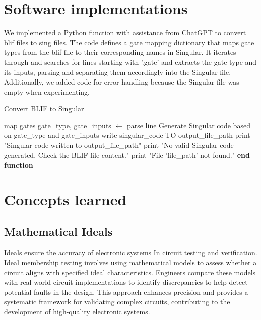 \documentclass[conference]{IEEEtran}
\begin{document}
\section{Software implementations} %
We implemented a Python function with assistance from ChatGPT to convert blif files to sing files. The code defines a gate mapping dictionary that maps gate types 
from the blif file to their corresponding names in Singular. It iterates through and searches for lines starting with '.gate' and extracts the gate type and its 
inputs, parsing and separating them accordingly into the Singular file. Additionally, we added code for error handling because the Singular file was empty when 
experimenting. 
\begin{algorithm}
    \caption{Convert BLIF to Singular}
    \begin{algorithmic}
            \STATE map gates
                    \STATE gate\_type, gate\_inputs $\gets$ parse line
                        \STATE Generate Singular code based on gate\_type and gate\_inputs
                    \ENDIF
                \ENDIF
            \ENDFOR
                \STATE write singular\_code TO output\_file\_path
                \STATE print "Singular code written to output\_file\_path"
            \ELSE
                \STATE print "No valid Singular code generated. Check the BLIF file content."
            \ENDIF
        \ELSE
            \STATE print "File 'file\_path' not found."
        \ENDIF
        \STATE \textbf{end function}
    \end{algorithmic}
    \end{algorithm}

\section{Concepts learned}
\subsection{Mathematical Ideals}
Ideals ensure the accuracy of electronic systems In circuit testing and verification. 
Ideal membership testing involves using mathematical 
models to assess whether a circuit aligns with specified ideal characteristics. 
Engineers compare these models with real-world circuit implementations to identify 
discrepancies to help detect potential faults in the design. This approach enhances 
precision and provides a systematic framework for validating complex circuits, 
contributing to the development of high-quality electronic systems.
\end{document}
